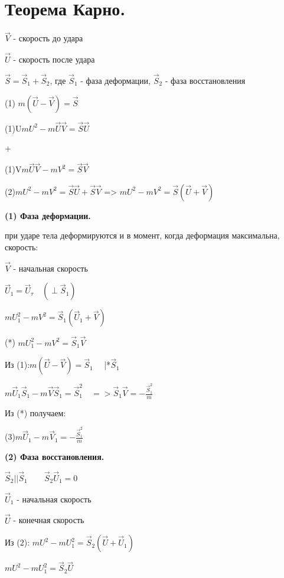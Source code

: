 {\section{Теорема Карно.}
\begin{center}
    \par $\vec{V}$ - скорость до удара 
    \par $\vec{U}$ - скорость после удара 
    \par $\vec{S} = \vec{S}_1 + \vec{S}_2$, где $\vec{S}_1$ - фаза деформации, $\vec{S}_2$ - фаза восстановления
    \par (1) \underline{$m(\vec{U}-\vec{V})=\vec{S}$}
    \par (1)U\qquad $mU^{2} - m\vec{U}\vec{V}=\vec{S}\vec{U}$
    \par +
    \par (1)V\qquad $m\vec{U}\vec{V}-mV^{2}=\vec{S}\vec{V}$
    \par (2)\underline{$mU^{2}-mV^{2}=\vec{S}\vec{U}+\vec{S}\vec{V}$} => $mU^{2}-mV^{2}=\vec{S}(\vec{U}+\vec{V})$
    \par \textbf{(1) Фаза деформации.}
    \par при ударе тела деформируются и в момент, когда деформация максимальна, скорость:
    \par $\vec{V}$ - начальная скорость
    \par $\vec{U}_1 = \vec{U}_\tau \quad (\perp \vec{S}_1)$
    \par $mU_1^{2}-mV^{2}=\vec{S}_1(\vec{U}_1+\vec{V})$
    \par (*) $mU_1^{2}-mV^{2}=\vec{S}_1\vec{V}$
    \par Из (1):\quad $m(\vec{U}-\vec{V})=\vec{S}_1 \quad$ |*$\vec{S}_1$  
    \par $m\vec{U}_1\vec{S}_1-m\vec{V}\vec{S}_1=\vec{S}_1^{2}\quad => \vec{S}_1\vec{V}=-\frac{\vec{S}_1^{2}}{m}$
    \par Из (*) получаем: 
    \par (3)$m\vec{U}_1-m\vec{V}_1=-\frac{\vec{S}_1^{2}}{m}$
    \par \textbf{(2) Фаза восстановления.}
    \par $\vec{S}_2 || \vec{S}_1 \qquad \vec{S}_2\vec{U}_1=0$
    \par $\vec{U}_1$ - начальная скорость
    \par $\vec{U}$ - конечная скорость
    \par Из (2): $mU^{2}-mU_1^{2}=\vec{S}_2(\vec{U}+\vec{U}_1)$
    \par $mU^{2}-mU_1^{2}=\vec{S}_2\vec{U}$

\end{center}}
